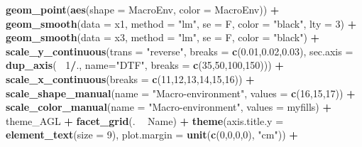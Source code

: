\documentclass[
]{article}
\newenvironment{Shaded}{\begin{snugshade}}{\end{snugshade}}
\newcommand{\DataTypeTok}[1]{\textcolor[rgb]{0.13,0.29,0.53}{#1}}
\newcommand{\DecValTok}[1]{\textcolor[rgb]{0.00,0.00,0.81}{#1}}
\newcommand{\FloatTok}[1]{\textcolor[rgb]{0.00,0.00,0.81}{#1}}
\newcommand{\KeywordTok}[1]{\textcolor[rgb]{0.13,0.29,0.53}{\textbf{#1}}}
\newcommand{\NormalTok}[1]{#1}
\newcommand{\OperatorTok}[1]{\textcolor[rgb]{0.81,0.36,0.00}{\textbf{#1}}}
\newcommand{\StringTok}[1]{\textcolor[rgb]{0.31,0.60,0.02}{#1}}
\begin{document}
\begin{Shaded}
\begin{Highlighting}[]
{{{{{\StringTok{  }\KeywordTok{geom_point}\NormalTok{(}\KeywordTok{aes}\NormalTok{(}\DataTypeTok{shape =}\NormalTok{ MacroEnv, }\DataTypeTok{color =}\NormalTok{ MacroEnv)) }\OperatorTok{+}
\StringTok{  }\KeywordTok{geom_smooth}\NormalTok{(}\DataTypeTok{data =}\NormalTok{ x1, }\DataTypeTok{method =} \StringTok{"lm"}\NormalTok{, }\DataTypeTok{se =}\NormalTok{ F, }\DataTypeTok{color =} \StringTok{"black"}\NormalTok{, }\DataTypeTok{lty =} \DecValTok{3}\NormalTok{) }\OperatorTok{+}
\StringTok{  }\KeywordTok{geom_smooth}\NormalTok{(}\DataTypeTok{data =}\NormalTok{ x3, }\DataTypeTok{method =} \StringTok{"lm"}\NormalTok{, }\DataTypeTok{se =}\NormalTok{ F, }\DataTypeTok{color =} \StringTok{"black"}\NormalTok{) }\OperatorTok{+}
\StringTok{  }\KeywordTok{scale_y_continuous}\NormalTok{(}\DataTypeTok{trans =} \StringTok{"reverse"}\NormalTok{, }\DataTypeTok{breaks =} \KeywordTok{c}\NormalTok{(}\FloatTok{0.01}\NormalTok{,}\FloatTok{0.02}\NormalTok{,}\FloatTok{0.03}\NormalTok{),}
        \DataTypeTok{sec.axis =} \KeywordTok{dup_axis}\NormalTok{(}\OperatorTok{~}\StringTok{ }\DecValTok{1}\OperatorTok{/}\NormalTok{., }\DataTypeTok{name=}\StringTok{"DTF"}\NormalTok{, }\DataTypeTok{breaks =} \KeywordTok{c}\NormalTok{(}\DecValTok{35}\NormalTok{,}\DecValTok{50}\NormalTok{,}\DecValTok{100}\NormalTok{,}\DecValTok{150}\NormalTok{))) }\OperatorTok{+}
\StringTok{  }\KeywordTok{scale_x_continuous}\NormalTok{(}\DataTypeTok{breaks =} \KeywordTok{c}\NormalTok{(}\DecValTok{11}\NormalTok{,}\DecValTok{12}\NormalTok{,}\DecValTok{13}\NormalTok{,}\DecValTok{14}\NormalTok{,}\DecValTok{15}\NormalTok{,}\DecValTok{16}\NormalTok{)) }\OperatorTok{+}
\StringTok{  }\KeywordTok{scale_shape_manual}\NormalTok{(}\DataTypeTok{name =} \StringTok{"Macro-environment"}\NormalTok{, }\DataTypeTok{values =} \KeywordTok{c}\NormalTok{(}\DecValTok{16}\NormalTok{,}\DecValTok{15}\NormalTok{,}\DecValTok{17}\NormalTok{)) }\OperatorTok{+}
\StringTok{  }\KeywordTok{scale_color_manual}\NormalTok{(}\DataTypeTok{name =} \StringTok{"Macro-environment"}\NormalTok{, }\DataTypeTok{values =}\NormalTok{ myfills) }\OperatorTok{+}
\StringTok{  }\NormalTok{theme_AGL }\OperatorTok{+}\StringTok{ }\KeywordTok{facet_grid}\NormalTok{(. }\OperatorTok{~}\StringTok{ }\NormalTok{Name) }\OperatorTok{+}\StringTok{ }
\StringTok{  }\KeywordTok{theme}\NormalTok{(}\DataTypeTok{axis.title.y =} \KeywordTok{element_text}\NormalTok{(}\DataTypeTok{size =} \DecValTok{9}\NormalTok{),}
        \DataTypeTok{plot.margin =} \KeywordTok{unit}\NormalTok{(}\KeywordTok{c}\NormalTok{(}\DecValTok{0}\NormalTok{,}\DecValTok{0}\NormalTok{,}\DecValTok{0}\NormalTok{,}\DecValTok{0}\NormalTok{), }\StringTok{"cm"}\NormalTok{)) }\OperatorTok{+}
}}}}}
\end{Highlighting}
\end{Shaded}
\end{document}
